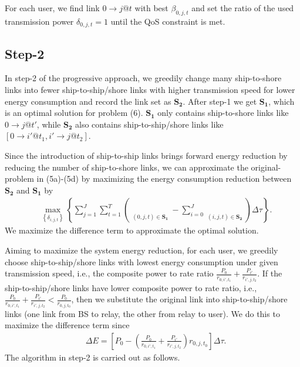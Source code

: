 \documentclass[conference]{IEEEtran}
\begin{document}
 For each user, we find link $0 \to j@t$ with best ${\beta _{0,j,t}}$ and set the ratio of the used transmission power ${\delta _{0,j,t} = 1}$ until the QoS constraint is met.
 

 \subsection{Step-2}
 
 In step-2 of the progressive approach, we greedily change many ship-to-shore links into fewer ship-to-ship/shore links with higher transmission speed for lower energy consumption and record the link set as ${{\mathbf{S}}_{\mathbf{2}}}$. After step-1 we get ${{\mathbf{S}}_{\mathbf{1}}}$, which is an optimal solution for problem (6). ${{\mathbf{S}}_{\mathbf{1}}}$ only contains ship-to-shore links like $0 \to j@t'$, while ${{\mathbf{S}}_{\mathbf{2}}}$ also contains ship-to-ship/shore links like $\left[ {0 \to i'@{t_1},i' \to j@{t_2}} \right]$. 
 
 Since the introduction of ship-to-ship links brings forward energy reduction by reducing the number of ship-to-shore links, we can approximate the original-problem in (5a)-(5d) by maximizing the energy consumption reduction between ${{\mathbf{S}}_{\mathbf{2}}}$ and ${{\mathbf{S}}_{\mathbf{1}}}$ by 
 \begin{align}
   &\mathop {\max }\limits_{{\left\{ {{\delta _{i,j,t}}} \right\}}} \left\{ {{\sum\limits_{j = 1}^J \sum\limits_{t = 1}^{T}{\left( {\mathop {{P_{0}}\delta _{0,j,t} }\limits_{\left( {0,j,t} \right) \in {{\mathbf{S}}_{\mathbf{1}}}} - \sum\limits_{i = 0}^J {\mathop {{P_{i}}\delta _{i,j,t}}\limits_{\left( {i,j,t} \right) \in {{\mathbf{S}}_{\mathbf{2}}}} } } \right) \Delta \tau } } } \right\}.
 \end{align}
  We maximize the difference term to approximate the optimal solution. 

 Aiming to maximize the system energy reduction, for each user, we greedily choose ship-to-ship/shore links with lowest energy consumption under given transmission speed, i.e., the composite power to rate ratio $ {\frac{{{P_0}}}{{{r_{0,i',{t_1}}}}} + \frac{{{P_{i'}}}}{{{r_{i',j,{t_2}}}}}} $. If the ship-to-ship/shore links have lower composite power to rate ratio, i.e., $ {\frac{{{P_0}}}{{{r_{0,i',{t_1}}}}} + \frac{{{P_{i'}}}}{{{r_{i',j,{t_2}}}}}} < \frac{{{P_0}}}{{{r_{0,j,{t_0}}}}}$, then we substitute the original link into ship-to-ship/shore links (one link from BS to relay, the other from relay to user). We do this to maximize the difference term since 
 \begin{align}
   &\Delta E  = \left[ {P_0}- \left( {\frac{{{P_0}}}{{{r_{0,i',{t_1}}}}} + \frac{{{P_{i'}}}}{{{r_{i',j,{t_2}}}}}} \right){r_{0,j,{t_0}}} \right] \Delta \tau.
 \end{align}
The algorithm in step-2 is carried out as follows.
 
\end{document}
